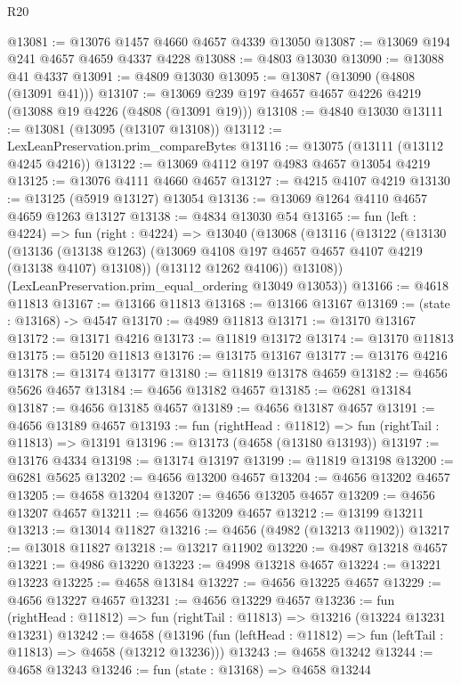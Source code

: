 \begin{lexlean}{R20}
\begin{coremodule}
@13081 := @13076 @1457 @4660 @4657 @4339 @13050
@13087 := @13069 @194 @241 @4657 @4659 @4337 @4228
@13088 := @4803 @13030
@13090 := @13088 @41 @4337
@13091 := @4809 @13030
@13095 := @13087 (@13090 (@4808 (@13091 @41)))
@13107 := @13069 @239 @197 @4657 @4657 @4226 @4219 (@13088 @19 @4226 (@4808 (@13091 @19)))
@13108 := @4840 @13030
@13111 := @13081 (@13095 (@13107 @13108))
@13112 := LexLeanPreservation.prim_compareBytes
@13116 := @13075 (@13111 (@13112 @4245 @4216))
@13122 := @13069 @4112 @197 @4983 @4657 @13054 @4219
@13125 := @13076 @4111 @4660 @4657
@13127 := @4215 @4107 @4219
@13130 := @13125 (@5919 @13127) @13054
@13136 := @13069 @1264 @4110 @4657 @4659 @1263 @13127
@13138 := @4834 @13030 @54
@13165 := fun (left : @4224) =>
  fun (right : @4224) =>
  @13040
    (@13068
      (@13116
        (@13122
          (@13130
            (@13136
              (@13138 @1263)
              (@13069 @4108 @197 @4657 @4657 @4107 @4219 (@13138 @4107) @13108))
            (@13112 @1262 @4106))
          @13108))
      (LexLeanPreservation.prim_equal_ordering @13049 @13053))
@13166 := @4618 @11813
@13167 := @13166 @11813
@13168 := @13166 @13167
@13169 := (state : @13168) -> @4547
@13170 := @4989 @11813
@13171 := @13170 @13167
@13172 := @13171 @4216
@13173 := @11819 @13172
@13174 := @13170 @11813
@13175 := @5120 @11813
@13176 := @13175 @13167
@13177 := @13176 @4216
@13178 := @13174 @13177
@13180 := @11819 @13178 @4659
@13182 := @4656 @5626 @4657
@13184 := @4656 @13182 @4657
@13185 := @6281 @13184
@13187 := @4656 @13185 @4657
@13189 := @4656 @13187 @4657
@13191 := @4656 @13189 @4657
@13193 := fun (rightHead : @11812) => fun (rightTail : @11813) => @13191
@13196 := @13173 (@4658 (@13180 @13193))
@13197 := @13176 @4334
@13198 := @13174 @13197
@13199 := @11819 @13198
@13200 := @6281 @5625
@13202 := @4656 @13200 @4657
@13204 := @4656 @13202 @4657
@13205 := @4658 @13204
@13207 := @4656 @13205 @4657
@13209 := @4656 @13207 @4657
@13211 := @4656 @13209 @4657
@13212 := @13199 @13211
@13213 := @13014 @11827
@13216 := @4656 (@4982 (@13213 @11902))
@13217 := @13018 @11827
@13218 := @13217 @11902
@13220 := @4987 @13218 @4657
@13221 := @4986 @13220
@13223 := @4998 @13218 @4657
@13224 := @13221 @13223
@13225 := @4658 @13184
@13227 := @4656 @13225 @4657
@13229 := @4656 @13227 @4657
@13231 := @4656 @13229 @4657
@13236 := fun (rightHead : @11812) => fun (rightTail : @11813) => @13216 (@13224 @13231 @13231)
@13242 := @4658
    (@13196 (fun (leftHead : @11812) => fun (leftTail : @11813) => @4658 (@13212 @13236)))
@13243 := @4658 @13242
@13244 := @4658 @13243
@13246 := fun (state : @13168) => @4658 @13244

\end{coremodule}
\end{lexlean}
